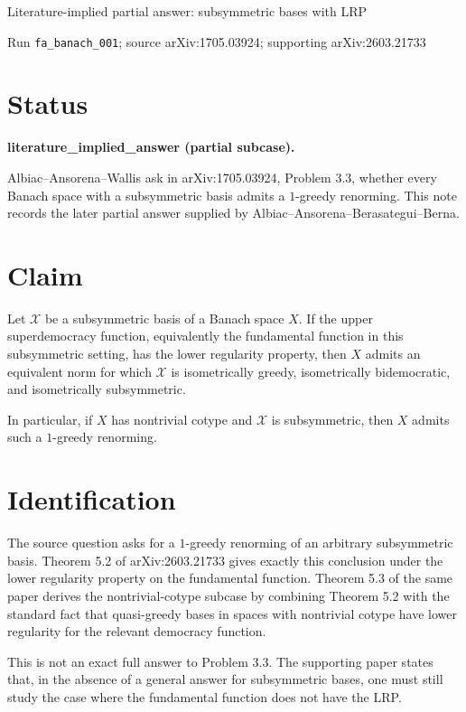 \documentclass[11pt]{article}
\newcommand{\XX}{X}
\newcommand{\XB}{\mathcal X}
\begin{document}
\begin{center}
{\Large Literature-implied partial answer: subsymmetric bases with LRP}

\medskip
{\small Run \texttt{fa\_banach\_001}; source arXiv:1705.03924; supporting arXiv:2603.21733}
\end{center}

\section*{Status}

\textbf{literature\_implied\_answer (partial subcase).}

Albiac--Ansorena--Wallis ask in arXiv:1705.03924, Problem 3.3, whether every
Banach space with a subsymmetric basis admits a \(1\)-greedy renorming. This
note records the later partial answer supplied by Albiac--Ansorena--Berasategui--Berna.

\section*{Claim}

Let \(\XB\) be a subsymmetric basis of a Banach space \(\XX\). If the upper
superdemocracy function, equivalently the fundamental function in this
subsymmetric setting, has the lower regularity property, then \(\XX\) admits
an equivalent norm for which \(\XB\) is isometrically greedy, isometrically
bidemocratic, and isometrically subsymmetric.

In particular, if \(\XX\) has nontrivial cotype and \(\XB\) is subsymmetric,
then \(\XX\) admits such a \(1\)-greedy renorming.

\section*{Identification}

The source question asks for a \(1\)-greedy renorming of an arbitrary
subsymmetric basis. Theorem 5.2 of arXiv:2603.21733 gives exactly this
conclusion under the lower regularity property on the fundamental function.
Theorem 5.3 of the same paper derives the nontrivial-cotype subcase by
combining Theorem 5.2 with the standard fact that quasi-greedy bases in spaces
with nontrivial cotype have lower regularity for the relevant democracy
function.

This is not an exact full answer to Problem 3.3. The supporting paper states
that, in the absence of a general answer for subsymmetric bases, one must still
study the case where the fundamental function does not have the LRP.
\end{document}
